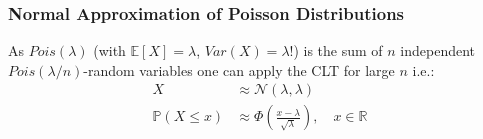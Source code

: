 \subsubsection{Normal Approximation of Poisson Distributions}
As $Pois(\lambda)$ (with $\mathbb{E}[X]=\lambda$, $Var(X)=\lambda$!) is the sum of $n$ independent $Pois(\lambda/n)$-random variables one can apply the CLT for large $n$ i.e.:
\begin{align*}
    X                   & \approx\mathcal{N}(\lambda, \lambda)                                          \\
    \mathbb{P}(X\leq x) & \approx\Phi\left(\frac{x-\lambda}{\sqrt{\lambda}}\right),\quad x\in\mathbb{R}
\end{align*}